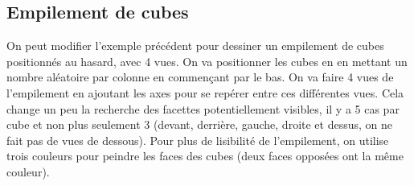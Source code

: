 \documentclass[%
10pt,%
a4paper,%
french,%
]%
{article}%
\begin{document}
\subsection{Empilement de cubes}

On peut modifier l'exemple précédent pour dessiner un empilement de cubes positionnés au hasard, avec 4 vues. On va positionner les cubes en en mettant un nombre aléatoire par colonne en commençant par le bas. On va faire 4 vues de l'empilement en ajoutant les axes pour se repérer entre ces différentes vues. Cela change un peu la recherche des facettes potentiellement visibles, il y a 5 cas par cube et non plus seulement 3 (devant, derrière, gauche, droite et dessus, on ne fait pas de vues de dessous). Pour plus de lisibilité de l'empilement, on utilise trois couleurs pour peindre les faces des cubes (deux faces opposées ont la même couleur).
\end{document}
